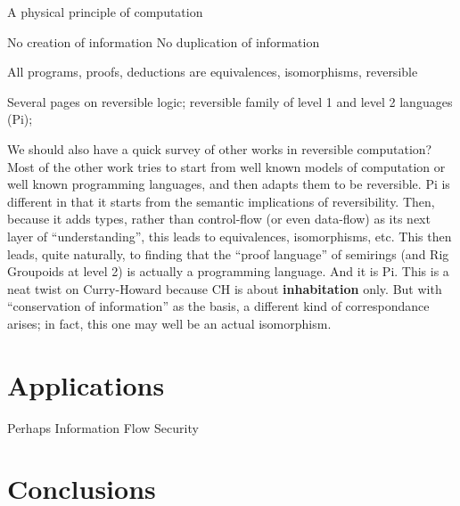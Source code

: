 \documentclass{article}
\newcommand{\jc}[1]{\fbox{Jacques says:} \textbf{#1}}
\begin{document}
A physical principle of computation

No creation of information
No duplication of information

All programs, proofs, deductions are equivalences, isomorphisms,
reversible

Several pages on reversible logic; reversible family of level 1 and
level 2 languages (Pi);

We should also have a quick survey of other works in reversible
computation? Most of the other work tries to start from well known
models of computation or well known programming languages, and then
adapts them to be reversible. Pi is different in that it starts from
the semantic implications of reversibility. Then, because it adds
types, rather than control-flow (or even data-flow) as its next layer
of ``understanding'', this leads to equivalences, isomorphisms, etc.
This then leads, quite naturally, to finding that the ``proof
language'' of semirings (and Rig Groupoids at level 2) is actually a
programming language. And it is Pi. This is a neat twist on
Curry-Howard because CH is about \textbf{inhabitation} only. But with
``conservation of information'' as the basis, a different kind of
correspondance arises; in fact, this one may well be an actual
isomorphism.

\section{Applications}

Perhaps Information Flow Security


\section{Conclusions}


\pagestyle{headings}

\end{document}
